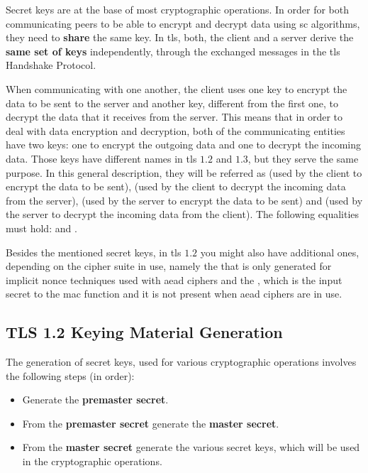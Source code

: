 \documentclass{llncs}
\begin{document}
Secret keys are at the base of most cryptographic operations.
In order for both communicating peers to be able to encrypt and decrypt data
using \gls{sc} algorithms, they need to \textbf{share} the same key. In \gls{tls}, both, the client and a server derive the \textbf{same set of keys}
independently, through the exchanged messages in the \gls{tls} Handshake Protocol.

When communicating with one another, the client uses one key to
encrypt the data to be sent to the server and another key, different from the first one, to decrypt the data
that it receives from the server. This means that in order to deal with data
encryption and decryption, both of the communicating entities have two keys:
one to encrypt the outgoing data and one to decrypt the incoming data. Those keys
have different names in \gls{tls} $1.2$ and $1.3$, but they serve the same
purpose. In this general description, they will be referred as 
(used by the client to encrypt the data to be sent), (used by the client to
decrypt the incoming data from the server), (used by the server to encrypt
the data to be sent) and (used by the server to decrypt the incoming
data from the client). The following equalities must hold:
 and .

Besides the mentioned secret keys, in \gls{tls} $1.2$ you might also have additional ones,
depending on the cipher suite in use, namely the  that
is only generated for implicit nonce techniques used with \gls{aead} ciphers and the
, which is the input secret to the \gls{mac}
function and it is not present when \gls{aead} ciphers are in use.

\subsection{TLS 1.2 Keying Material Generation}

The generation of secret keys, used for various cryptographic operations involves the
following steps (in order):

\begin{itemize}
  \item Generate the \textbf{premaster secret}.
  \item From the \textbf{premaster secret} generate the \textbf{master secret}.
  \item From the \textbf{master secret} generate the various secret keys, which
  will be used in the cryptographic operations.
\end{itemize}
\end{document}
